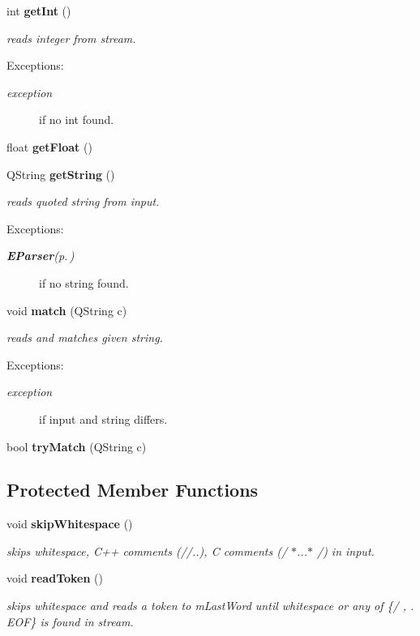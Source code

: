 \begin{CompactItemize}
int {\bf get\-Int} ()
\begin{CompactList}\small\item\em reads integer from stream. \begin{Desc}
\item[Exceptions:]
\begin{description}
\item[{\em exception}]if no int found. \end{description}
\end{Desc}
\item\end{CompactList}\item 
float {\bf get\-Float} ()
\item 
QString {\bf get\-String} ()
\begin{CompactList}\small\item\em reads quoted string from input. \begin{Desc}
\item[Exceptions:]
\begin{description}
\item[{\em {\bf EParser}{\rm (p.\,\pageref{classEParser})}}]if no string found. \end{description}
\end{Desc}
\item\end{CompactList}\item 
void {\bf match} (QString c)
\begin{CompactList}\small\item\em reads and matches given string. \begin{Desc}
\item[Exceptions:]
\begin{description}
\item[{\em exception}]if input and string differs. \end{description}
\end{Desc}
\item\end{CompactList}\item 
bool {\bf try\-Match} (QString c)
\end{CompactItemize}
\subsection*{Protected Member Functions}
\begin{CompactItemize}
\item 
void {\bf skip\-Whitespace} ()
\begin{CompactList}\small\item\em skips whitespace, C++ comments (//..), C comments (/ $\ast$...$\ast$ /) in input. \item\end{CompactList}\item 
void {\bf read\-Token} ()
\begin{CompactList}\small\item\em skips whitespace and reads a token to m\-Last\-Word until whitespace or any of \{/ , . EOF\} is found in stream. \item\end{CompactList}\end{CompactItemize}
